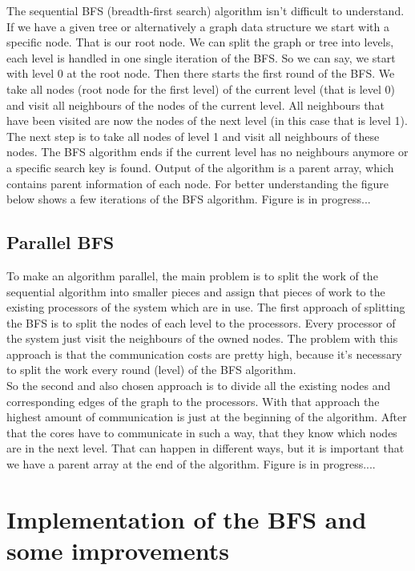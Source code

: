 \documentclass[12pt,a4paper]{article}
\begin{document}
The sequential BFS (breadth-first search) algorithm isn't difficult to understand. If we have a given tree or alternatively a graph data structure we start with a specific node. That is our root node. We can split the graph or tree into levels, each level is handled in one single iteration of the BFS. So we can say, we start with level 0 at the root node.
Then there starts the first round of the BFS. We take all nodes (root node for the first level) of the current level (that is level 0) and visit all neighbours of the nodes of the current level. All neighbours that have been visited are now the nodes of the next level (in this case that is level 1). The next step is to take all nodes of level 1 and visit all neighbours of these nodes. The BFS algorithm ends if the current level has no neighbours anymore or a specific search key is found. Output of the algorithm is a parent array, which contains parent information of each node. For better understanding the figure below shows a few iterations of the BFS algorithm. Figure is in progress...

\subsection{Parallel BFS}
\label{sec:parallel-bfs}

To make an algorithm parallel, the main problem is to split the work of the sequential algorithm into smaller pieces and assign that pieces of work to the existing processors of the system which are in use. 
The first approach of splitting the BFS is to split the nodes of each level to the processors. Every processor of the system just visit the neighbours of the owned nodes. The problem with this approach is that the communication costs are pretty high, because it's necessary to split the work every round (level) of the BFS algorithm.\\
So the second and also chosen approach is to divide all the existing nodes and corresponding edges of the graph to the processors. With that approach the highest amount of communication is just at the beginning of the algorithm. After that the cores have to communicate in such a way, that they know which nodes are in the next level. That can happen in different ways, but it is important that we have a parent array at the end of the algorithm.  Figure is in progress....

\section{Implementation of the BFS and some improvements}
\label{sec:implementations}
\end{document}
